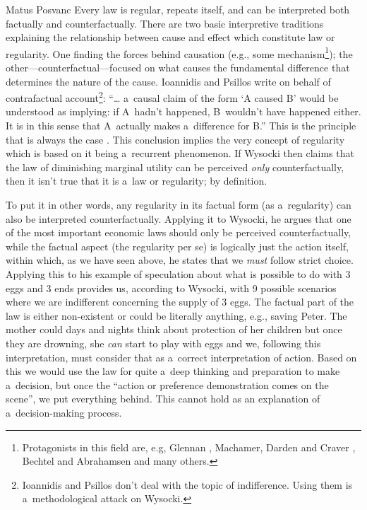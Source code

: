 \begin{artengenv}{Matus Posvanc}
Every law is regular, repeats itself, and can be interpreted both factually and counterfactually. There are two basic interpretive traditions explaining the relationship between cause and effect which constitute law or regularity. One finding the forces behind causation (e.g., some mechanism\footnote{Protagonists in this field are, e.g, Glennan 
\parencite*[][]{Glennan1996Mechanisms}, %
 Machamer, Darden and Craver 
\parencite*[][]{Machamer2000Thinking}, %
 Bechtel and Abrahamsen 
\parencite*[][]{Bechtel2005Explanation} %
 and many others. }); the other---counterfactual---focused on what causes the fundamental difference that determines the nature of the cause. Ioannidis and Psillos 
\parencite*[][p.144]{Ioannidis2018Mechanisms} %
 write on behalf of contrafactual account\footnote{Ioannidis and Psillos don't deal with the topic of indifference. Using them is a~methodological attack on Wysocki.}: ``… a~causal claim of the form ‘A caused B' would be understood as implying: if A~hadn't happened, B~wouldn't have happened either. It is in this sense that A~actually makes a~difference for B.'' This is the principle that is always the case 
\parencite[except for a~once-existing or irregular mechanism, see][p.153]{Ioannidis2018Mechanisms}. %
 This conclusion implies the very concept of regularity which is based on it being a~recurrent phenomenon. If Wysocki then claims that the law of diminishing marginal utility can be perceived \textit{only} counterfactually, then it isn't true that it is a~law or regularity; by definition.



To put it in other words, any regularity in its factual form (as a~regularity) can also be interpreted counterfactually. Applying it to Wysocki, he argues that one of the most important economic laws should only be perceived counterfactually, while the factual aspect (the regularity per se) is logically just the action itself, within which, as we have seen above, he states that we \textit{must} follow strict choice. Applying this to his example of speculation about what is possible to do with 3 eggs and 3 ends provides us, according to Wysocki, with 9 possible scenarios where we are indifferent concerning the supply of 3 eggs. The factual part of the law is either non-existent or could be literally anything, e.g., saving Peter. The mother could days and nights think about protection of her children but once they are drowning, she \textit{can} start to play with eggs and we, following this interpretation, must consider that as a~correct interpretation of action. Based on this we would use the law for quite a~deep thinking and preparation to make a~decision, but once the ``action or preference demonstration comes on the scene'', we put everything behind. This cannot hold as an explanation of a~decision-making process.




\end{artengenv}
